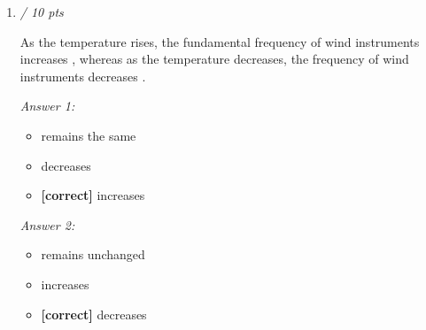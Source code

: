 \documentclass[11pt]{article}
\begin{document}
\begin{enumerate}[leftmargin=*,label=\textbf{Question \arabic*.}]
A sound source creates a sound intensity at a certain distance. If the sound intensity is increased by a factor of 19.3, by how many decibels is the sound intensity level increased?

\textit{Correct answer: } 12.8556

\item \hfill \textit{/ 10 pts}

As the temperature rises, the fundamental frequency of wind instruments increases
, whereas as the temperature decreases, the frequency of wind instruments decreases
.

\textit{Answer 1:}
\begin{itemize}
  \item remains the same
  \item decreases
  \item \textbf{[correct]} increases
\end{itemize}
\textit{Answer 2:}
\begin{itemize}
  \item remains unchanged
  \item increases
  \item \textbf{[correct]} decreases
\end{itemize}

\end{enumerate}
\end{document}
